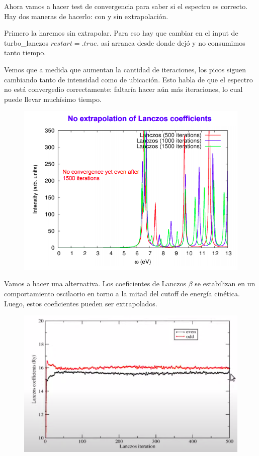   Ahora vamos a hacer test de convergencia para saber si el espectro es correcto. Hay dos maneras de hacerlo: con y sin extrapolación.

  Primero la haremos sin extrapolar. Para eso hay que cambiar en el input de turbo\_lanczos $restart = .true.$ así arranca desde donde dejó y no consumimos tanto tiempo.

  Vemos que a medida que aumentan la cantidad de iteraciones, los picos siguen cambiando tanto de intensidad como de ubicación. Esto habla de que el espectro no está convergedio correctamente: faltaría hacer aún más iteraciones, lo cual puede llevar muchísimo tiempo.

  \begin{figure}[H]
      \centering
      \includegraphics[scale = 0.6]{figs/D6/Lan_no_extra.png}
  \end{figure}

  Vamos a hacer una alternativa. Los coeficientes de Lanczos $\beta$ se estabilizan en un comportamiento oscilaorio en torno a la mitad del cutoff de energía cinética. Luego, estos coeficientes pueden ser extrapolados.

  \begin{figure}[H]
      \centering
      \includegraphics[scale = 0.4]{figs/D6/betas.png}
  \end{figure}

